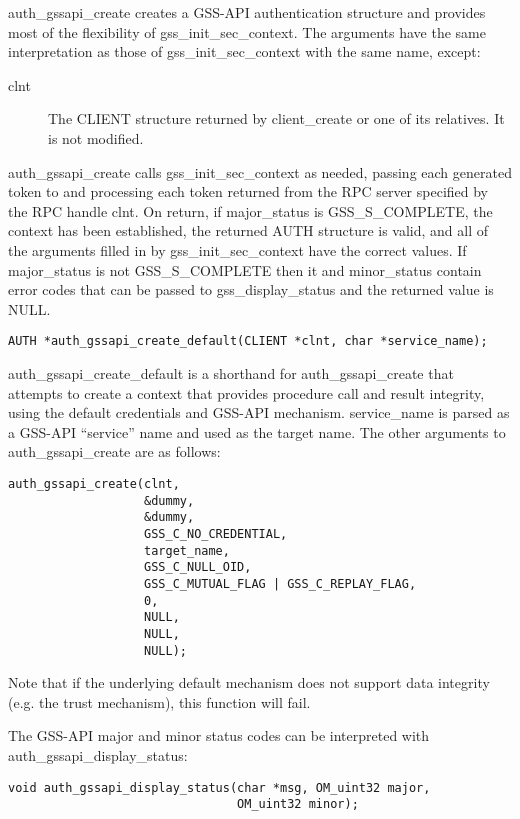 auth_gssapi_create creates a GSS-API authentication structure and
provides most of the flexibility of gss_init_sec_context.  The
arguments have the same interpretation as those of
gss_init_sec_context with the same name, except:

\begin{description}
\item[clnt] The CLIENT structure returned by client_create or one of
its relatives.  It is not modified.
\end{description}

auth_gssapi_create calls gss_init_sec_context as needed, passing each
generated token to and processing each token returned from the RPC
server specified by the RPC handle clnt.  On return, if major_status
is GSS_S_COMPLETE, the context has been established, the returned AUTH
structure is valid, and all of the arguments filled in by
gss_init_sec_context have the correct values.  If major_status is not
GSS_S_COMPLETE then it and minor_status contain error codes that can
be passed to gss_display_status and the returned value is NULL.

\begin{verbatim}
AUTH *auth_gssapi_create_default(CLIENT *clnt, char *service_name);
\end{verbatim}

auth_gssapi_create_default is a shorthand for auth_gssapi_create that
attempts to create a context that provides procedure call and result
integrity, using the default credentials and GSS-API mechanism.
service_name is parsed as a GSS-API ``service'' name and used as the
target name.  The other arguments to auth_gssapi_create are as follows:

\begin{verbatim}
auth_gssapi_create(clnt,
                   &dummy,
                   &dummy,
                   GSS_C_NO_CREDENTIAL,
                   target_name,
                   GSS_C_NULL_OID,
                   GSS_C_MUTUAL_FLAG | GSS_C_REPLAY_FLAG,
                   0,
                   NULL,
                   NULL,
                   NULL);
\end{verbatim}

Note that if the underlying default mechanism does not support data
integrity (e.g. the trust mechanism), this function will fail.

The GSS-API major and minor status codes can be interpreted with
auth_gssapi_display_status:

\begin{verbatim}
void auth_gssapi_display_status(char *msg, OM_uint32 major, 
                                OM_uint32 minor); 
\end{verbatim}

